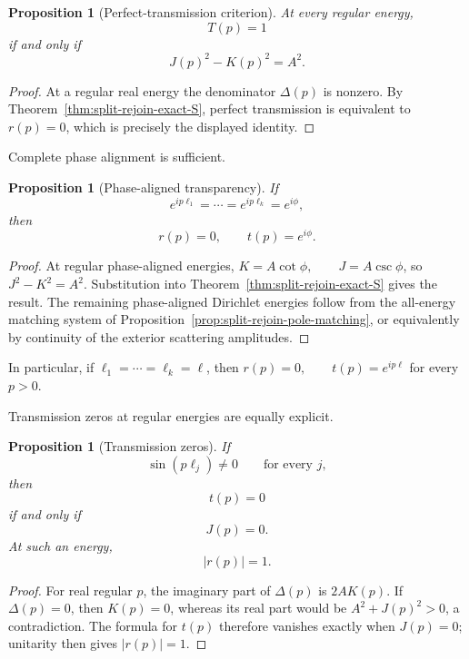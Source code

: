 \documentclass[11pt]{article}
\theoremstyle{plain}
\newtheorem{proposition}[theorem]{Proposition}
\theoremstyle{definition}
\begin{document}
\begin{proposition}[Perfect-transmission criterion]
\label{prop:split-rejoin-perfect}
At every regular energy,
\[
  T(p)=1
\]
if and only if
\[
  J(p)^2-K(p)^2=A^2.
\]
\end{proposition}

\begin{proof}
At a regular real energy the denominator \(\Delta(p)\) is nonzero. By
Theorem~\ref{thm:split-rejoin-exact-S}, perfect transmission is equivalent
to \(r(p)=0\), which is precisely the displayed identity.
\end{proof}

Complete phase alignment is sufficient.

\begin{proposition}[Phase-aligned transparency]
\label{prop:split-rejoin-phase-alignment}
If
\[
  e^{ip\ell_1}
  =
  \cdots
  =
  e^{ip\ell_k}
  =
  e^{i\phi},
\]
then
\[
  r(p)=0,
  \qquad
  t(p)=e^{i\phi}.
\]
\end{proposition}

\begin{proof}
At regular phase-aligned energies,
\(K=A\cot\phi, \qquad J=A\csc\phi\),
so
\(J^2-K^2=A^2\).
Substitution into
Theorem~\ref{thm:split-rejoin-exact-S} gives the result. The remaining
phase-aligned Dirichlet energies follow from the all-energy matching system
of Proposition~\ref{prop:split-rejoin-pole-matching}, or equivalently by
continuity of the exterior scattering amplitudes.
\end{proof}

In particular, if
\(\ell_1=\cdots=\ell_k=\ell\),
then \(r(p)=0, \qquad t(p)=e^{ip\ell}\) for every \(p>0\).

Transmission zeros at regular energies are equally explicit.

\begin{proposition}[Transmission zeros]
\label{prop:split-rejoin-transmission-zero}
If
\[
  \sin(p\ell_j)\neq0
  \qquad
  \text{for every }j,
\]
then
\[
  t(p)=0
\]
if and only if
\[
  J(p)=0.
\]
At such an energy,
\[
  |r(p)|=1.
\]
\end{proposition}

\begin{proof}
For real regular \(p\), the imaginary part of \(\Delta(p)\) is \(2AK(p)\).
If \(\Delta(p)=0\), then \(K(p)=0\), whereas its real part would be
\(A^2+J(p)^2>0\), a contradiction. The formula for \(t(p)\) therefore
vanishes exactly when \(J(p)=0\); unitarity then gives \(|r(p)|=1\).
\end{proof}
\end{document}

